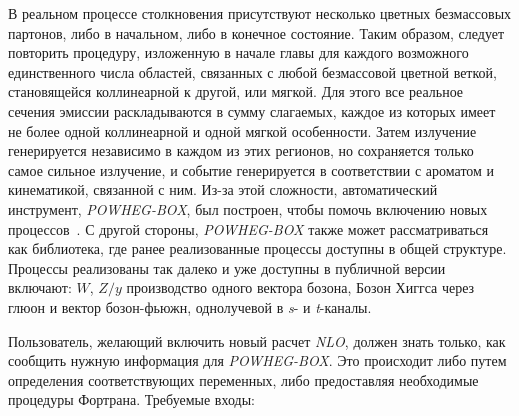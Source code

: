 В реальном процессе столкновения присутствуют несколько цветных безмассовых партонов, либо в начальном, либо в
конечное состояние. Таким образом, следует повторить процедуру, изложенную в начале главы для каждого возможного единственного числа
областей, связанных с любой безмассовой цветной веткой, становящейся коллинеарной к другой, или мягкой.
Для этого все реальное сечения эмиссии раскладываются в сумму слагаемых, каждое
из которых имеет не более одной коллинеарной и одной мягкой особенности. Затем излучение генерируется
независимо в каждом из этих регионов, но сохраняется только самое сильное излучение, и событие
генерируется в соответствии с ароматом и кинематикой, связанной с ним. Из-за этой сложности,
автоматический инструмент, \textit{POWHEG-BOX}, был построен, чтобы помочь включению новых
процессов~\cite{review-powheg}. С другой стороны, \textit{POWHEG-BOX} также может рассматриваться как библиотека, где ранее
реализованные процессы доступны в общей структуре. Процессы реализованы так
далеко и уже доступны в публичной версии включают: $W$, $Z / y$ производство одного вектора бозона,
Бозон Хиггса через глюон и вектор бозон-фьюжн, однолучевой в \textit{s}- и \textit{t}-каналы.

Пользователь, желающий включить новый расчет \textit{NLO}, должен знать только, как сообщить
нужную информация для \textit{POWHEG-BOX}. Это происходит либо путем определения соответствующих переменных,
либо предоставляя необходимые процедуры Фортрана. Требуемые входы:

